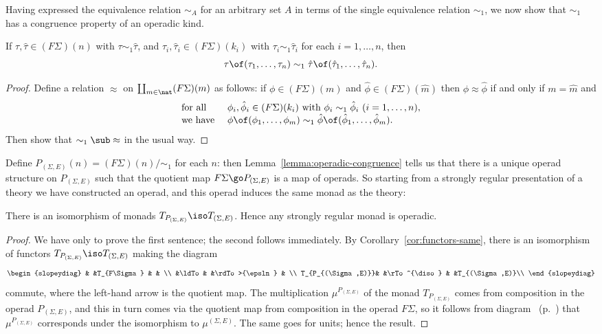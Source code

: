 Having expressed the equivalence relation $\sim_A$ for an arbitrary set $A$
in terms of the single equivalence relation $\sim_1$, we now show that
$\sim_1$ has a congruence property of an operadic kind.
%
\begin{lemma}	
If $\tau, \hat{\tau} \in (F\Sigma)(n)$ with $\tau \sim_1 \hat{\tau}$, and
$\tau_i, \hat{\tau}_i \in (F\Sigma)(k_i)$ with $\tau_i \sim_1 \hat{\tau}_i$
for each $i = 1, \ldots, n$, then
\[
\tau \of (\tau_1, \ldots, \tau_n) \sim_1 
\hat{\tau} \of (\hat{\tau}_1, \ldots, \hat{\tau}_n).
\]
\end{lemma}

\begin{proof}
Define a relation $\approx$ on $\coprod_{m\in\nat}(F\Sigma)(m)$ as follows:
if $\phi\in (F\Sigma)(m)$ and $\hat{\phi}\in (F\Sigma)(\hat{m})$ then $\phi
\approx \hat{\phi}$ if and only if $m=\hat{m}$ and
\[
\begin{array}{ll}
\textrm{for all }  	&
\phi_i, \hat{\phi}_i \in (F\Sigma)(k_i) 
\textrm{ with }
\phi_i \sim_1 \hat{\phi}_i
\ (i = 1, \ldots, n),	\\
\textrm{we have }	&
\phi \of (\phi_1, \ldots, \phi_m)
\sim_1
\hat{\phi} \of (\hat{\phi}_1, \ldots, \hat{\phi}_m).
\end{array}
\]
Then show that $\sim_1 \sub \approx$ in the usual way. 
\done
\end{proof}
%
Define $P_{(\Sigma,E)}(n) = (F\Sigma)(n)/\sim_1$ for each $n$: then
Lemma~\ref{lemma:operadic-congruence} tells us that there is a unique
operad structure on $P_{(\Sigma,E)}$ such that the quotient map $F\Sigma
\go P_{(\Sigma,E)}$ is a map of operads.  So starting from a strongly
regular presentation of a theory we have constructed an operad, and this
operad induces the same monad as the theory:
%
\begin{cor}	
There is an isomorphism of monads $T_{P_{(\Sigma,E)}} \iso
T_{(\Sigma,E)}$.  Hence any strongly regular monad is operadic.
\end{cor}
%
\begin{proof}
We have only to prove the first sentence; the second follows immediately.
By Corollary~\ref{cor:functors-same}, there is an isomorphism of functors
$T_{P_{(\Sigma,E)}} \iso T_{(\Sigma,E)}$ making the diagram
\[
\begin{slopeydiag}
		&	&T_{F\Sigma}	&		&	\\
		&\ldTo	&		&\rdTo>{\epsln}	&	\\
T_{P_{(\Sigma,E)}}&	&\rTo^{\diso}	&		&T_{(\Sigma,E)}\\
\end{slopeydiag}
\]
commute, where the left-hand arrow is the quotient map.  The multiplication
$\mu^{P_{(\Sigma,E)}}$ of the monad $T_{P_{(\Sigma,E)}}$ comes from
composition in the operad $P_{(\Sigma,E)}$, and this in turn comes via the
quotient map from composition in the operad $F\Sigma$, so it follows from
diagram~ (p.~\pageref{eq:qt-mult-unit}) that
$\mu^{P_{(\Sigma,E)}}$ corresponds under the isomorphism to
$\mu^{(\Sigma,E)}$.  The same goes for units; hence the result.  \done
\end{proof}

